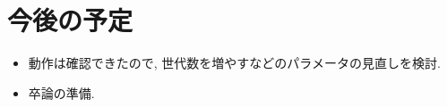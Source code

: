 \documentclass[twocolumn]{jarticle}     %
\newcommand{\argmin}{\mathop{\rm arg~min}\limits}
\begin{document}
%
%

\section{今後の予定}
\begin{itemize}
  \item 動作は確認できたので, 世代数を増やすなどのパラメータの見直しを検討.
  \item 卒論の準備.

\end{itemize}



\end{document}
